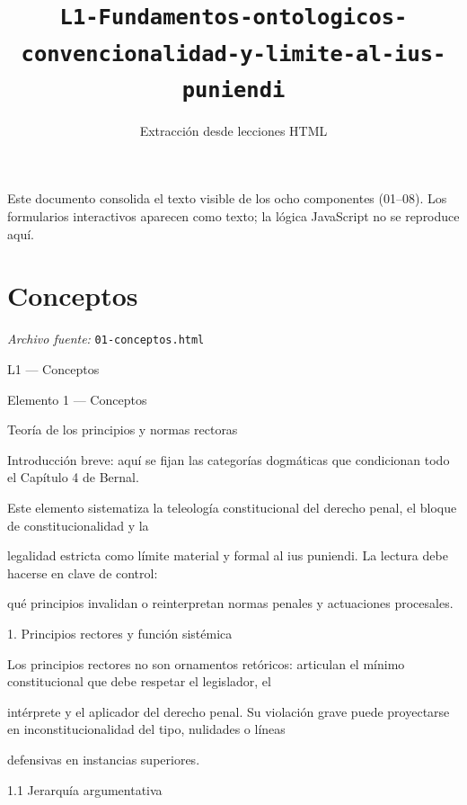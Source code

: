 \documentclass[11pt,a4paper]{article}
\title{\texttt{L1-Fundamentos-ontologicos-convencionalidad-y-limite-al-ius-puniendi}}
\author{Extracci\'on desde lecciones HTML}
\date{}
\begin{document}
\maketitle

\begin{small}
\noindent Este documento consolida el texto visible de los ocho componentes (01--08). Los formularios interactivos aparecen como texto; la l\'ogica JavaScript no se reproduce aqu\'i.
\end{small}
\bigskip
\section{Conceptos}
\noindent\textit{Archivo fuente:} \texttt{01-conceptos.html}

L1 — Conceptos\par





    Elemento 1 — Conceptos\par
    Teoría de los principios y normas rectoras\par

    Introducción breve: aquí se fijan las categorías dogmáticas que condicionan todo el Capítulo 4 de Bernal.\par


      Este elemento sistematiza la teleología constitucional del derecho penal, el bloque de constitucionalidad y la\par
      legalidad estricta como límite material y formal al ius puniendi. La lectura debe hacerse en clave de control:\par
      qué principios invalidan o reinterpretan normas penales y actuaciones procesales.\par



      1. Principios rectores y función sistémica\par


        Los principios rectores no son ornamentos retóricos: articulan el mínimo constitucional que debe respetar el legislador, el\par
        intérprete y el aplicador del derecho penal. Su violación grave puede proyectarse en inconstitucionalidad del tipo, nulidades o líneas\par
        defensivas en instancias superiores.\par



        1.1 Jerarquía argumentativa\par
\end{document}
